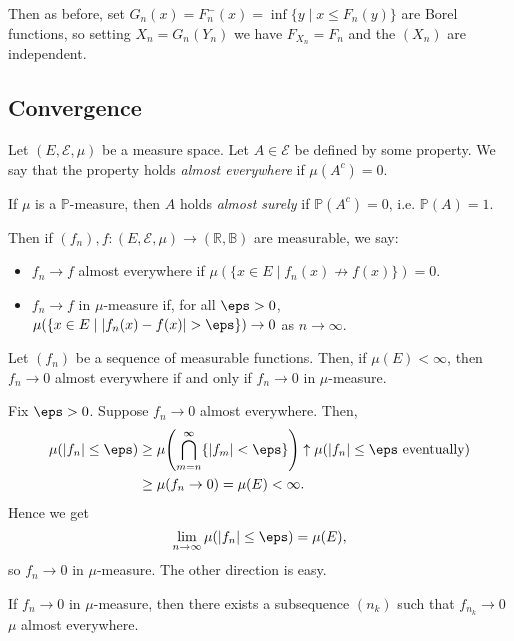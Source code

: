 \documentclass[12pt]{article}
\begin{document}
Then as before, set $G_n(x) = F_n^{-}(x) = \inf\{y \mid x \leq F_n(y)\}$ are Borel functions, so setting $X_n = G_n(Y_n)$ we have $F_{X_n} = F_n$ and the $(X_n)$ are independent.

\subsection{Convergence}
\label{sub:convergence}

Let $(E, \mathcal{E}, \mu)$ be a measure space. Let $A \in \mathcal{E}$ be defined by some property. We say that the property holds \emph{almost everywhere} if $\mu(A^{c}) = 0$.

If $\mu$ is a $\mathbb{P}$-measure, then $A$ holds \emph{almost surely} if $\mathbb{P}(A^{c}) = 0$, i.e. $\mathbb{P}(A) = 1$.

Then if $(f_n), f : (E, \mathcal{E}, \mu) \to (\mathbb{R}, \mathbb{B})$ are measurable, we say:
\begin{itemize}
	\item $f_n \to f$ almost everywhere if $\mu(\{x \in E \mid f_n(x) \not \to f(x)\}) = 0$.
	\item $f_n \to f$ in $\mu$-measure if, for all $\eps > 0$, $\mu(\{x \in E \mid |f_n(x) - f(x)| > \eps\}) \to 0$ as $n \to \infty$.
\end{itemize}

\begin{theorem}
	Let $(f_n)$ be a sequence of measurable functions. Then, if $\mu(E) < \infty$, then $f_n \to 0$ almost everywhere if and only if $f_n \to 0$ in $\mu$-measure.
\end{theorem}

\begin{proofbox}
	Fix $\eps > 0$. Suppose $f_n \to 0$ almost everywhere. Then,
	\begin{align*}
		\mu(|f_n| \leq \eps) &\ge \mu \Biggl( \bigcap_{m = n}^{\infty} \{|f_m| < \eps\}\Biggr) \uparrow \mu(|f_n| \leq \eps \text{ eventually}) \\
				     &\ge \mu(f_n \to 0) = \mu(E) < \infty.
	\end{align*}
	Hence we get
	\[
	\lim_{n\to \infty} \mu(|f_n| \leq \eps) = \mu(E),
	\]
	so $f_n \to 0$ in $\mu$-measure. The other direction is easy.
\end{proofbox}


\begin{theorem}
	If $f_n \to 0$ in $\mu$-measure, then there exists a subsequence $(n_k)$ such that $f_{n_k} \to 0$ $\mu$ almost everywhere.
\end{theorem}
\end{document}
